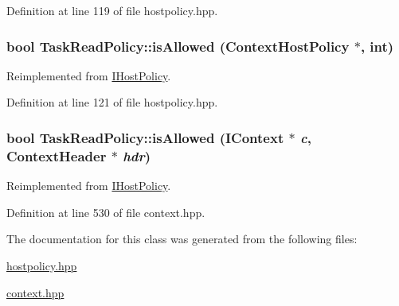 Definition at line 119 of file hostpolicy.hpp.\hypertarget{class_task_read_policy_a94a18c877a66a55844d538f47deb171d}{
\subsubsection[{isAllowed}]{\setlength{\rightskip}{0pt plus 5cm}bool TaskReadPolicy::isAllowed ({\bf ContextHostPolicy} $\ast$, \/  int)}}
\label{class_task_read_policy_a94a18c877a66a55844d538f47deb171d}


Reimplemented from \hyperlink{class_i_host_policy_ad7665cb96e008e8f189201662ae32736}{IHostPolicy}.

Definition at line 121 of file hostpolicy.hpp.\hypertarget{class_task_read_policy_a10db4c46db394c083c73589cb998e5c3}{
\subsubsection[{isAllowed}]{\setlength{\rightskip}{0pt plus 5cm}bool TaskReadPolicy::isAllowed ({\bf IContext} $\ast$ {\em c}, \/  {\bf ContextHeader} $\ast$ {\em hdr})}}
\label{class_task_read_policy_a10db4c46db394c083c73589cb998e5c3}


Reimplemented from \hyperlink{class_i_host_policy_a5200e3143a640e492438361a3fd2626a}{IHostPolicy}.

Definition at line 530 of file context.hpp.

The documentation for this class was generated from the following files:\begin{DoxyCompactItemize}
\item 
\hyperlink{hostpolicy_8hpp}{hostpolicy.hpp}\item 
\hyperlink{context_8hpp}{context.hpp}\end{DoxyCompactItemize}
